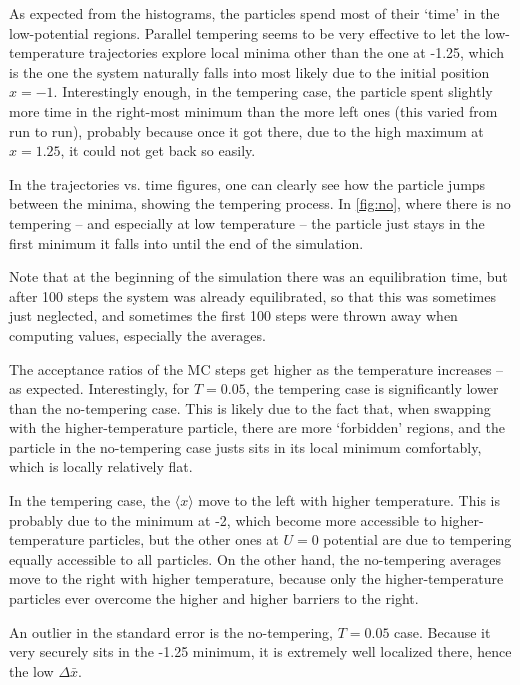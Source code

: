 \documentclass[11pt]{article}
\begin{document}
As expected from the histograms, the particles spend most of their `time' in the low-potential regions. Parallel tempering seems to be very effective to let the low-temperature trajectories explore local minima other than the one at -1.25, which is the one the system naturally falls into most likely due to the initial position $x = -1$.
Interestingly enough, in the tempering case, the particle spent slightly more time in the right-most minimum than the more left ones (this varied from run to run), probably because once it got there, due to the high maximum at $x = 1.25$, it could not get back so easily.

In the trajectories vs. time figures, one can clearly see how the particle jumps between the minima, showing the tempering process. In \autoref{fig:no}, where there is no tempering -- and especially at low temperature -- the particle just stays in the first minimum it falls into until the end of the simulation.

Note that at the beginning of the simulation there was an equilibration time, but after 100 steps the system was already equilibrated, so that this was sometimes just neglected, and sometimes the first 100 steps were thrown away when computing values, especially the averages.

The acceptance ratios of the MC steps get higher as the temperature increases -- as expected. Interestingly, for $T = 0.05$, the tempering case is significantly lower than the no-tempering case. This is likely due to the fact that, when swapping with the higher-temperature particle, there are more `forbidden' regions, and the particle in the no-tempering case justs sits in its local minimum comfortably, which is locally relatively flat.

In the tempering case, the $\langle x\rangle$ move to the left with higher temperature. This is probably due to the minimum at -2, which become more accessible to higher-temperature particles, but the other ones at $U = 0$ potential are due to tempering equally accessible to all particles.
On the other hand, the no-tempering averages move to the right with higher temperature, because only the higher-temperature particles ever overcome the higher and higher barriers to the right.

An outlier in the standard error is the no-tempering, $T = 0.05$ case. Because it very securely sits in the -1.25 minimum, it is extremely well localized there, hence the low $\Delta\bar x$.
\end{document}
